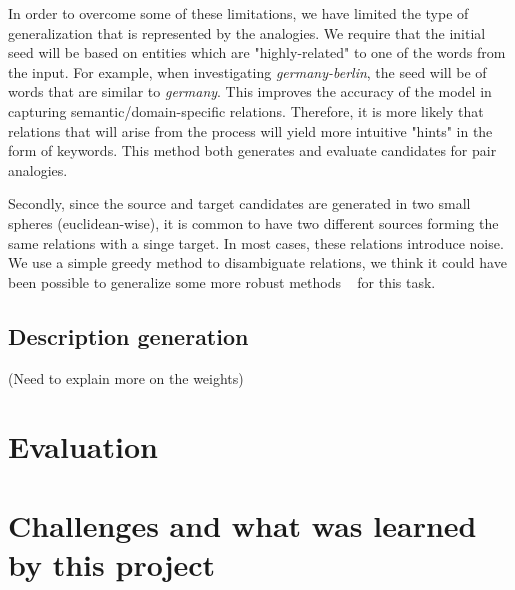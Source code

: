 \documentclass[11pt,a4paper]{article}
\begin{document}
In order to overcome some of these limitations, we have limited the type of generalization that is represented by the analogies. We require that the initial seed will be based on entities which are "highly-related" to one of the words from the input. For example, when investigating \textit{germany-berlin}, the seed will be of words that are similar to \textit{germany}. This improves the accuracy of the model in capturing semantic/domain-specific relations. Therefore, it is more likely that relations that will arise from the process will yield more intuitive "hints" in the form of keywords. This method both generates and evaluate candidates for pair analogies.

Secondly, since the source and target candidates are generated in two small spheres (euclidean-wise), it is common to have two different sources forming the same relations with a singe target. In most cases, these relations introduce noise. We use a simple greedy method to disambiguate relations, we think it could have been possible to generalize some more robust methods ~\cite{daelemans1999introduction} for this task.

\subsection{Description generation}

(Need to explain more on the weights)


\section{Evaluation}

\section{Challenges and what was learned by this project}
\end{document}

